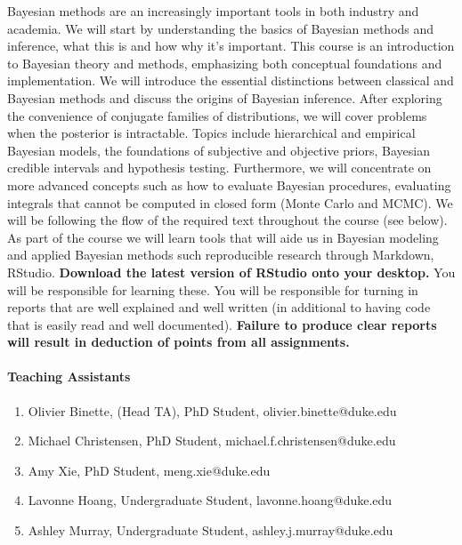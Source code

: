 \documentclass[11pt]{article}
\begin{document}
Bayesian methods are an increasingly important tools
in both industry and academia. We will start by understanding the basics of Bayesian methods and inference, what this is and how why it's important. This course is an introduction to Bayesian theory and methods, emphasizing both conceptual foundations and implementation. We will introduce the essential distinctions between classical and Bayesian methods and discuss the origins of Bayesian inference. After exploring the convenience of conjugate families of distributions, we will cover problems when the posterior is intractable. Topics include hierarchical and empirical Bayesian models, the foundations of subjective and objective priors, Bayesian credible intervals and hypothesis testing. Furthermore, we 
will  concentrate on more advanced concepts such as how to evaluate Bayesian procedures, evaluating integrals that cannot be computed in closed form (Monte Carlo and MCMC). We will be following the flow of the required text throughout the course (see below). \\

As part of the course we will learn tools that will aide us in Bayesian modeling and applied Bayesian methods such reproducible research through Markdown, RStudio. \textbf{Download the latest version of RStudio onto your desktop.} You will be responsible for learning these. You will be responsible for turning in reports that are well explained and well written (in additional to having code that is easily read and well documented). \textbf{Failure to produce clear reports will result in deduction of points from all assignments.} 
\\


\paragraph{Teaching Assistants}

\begin{enumerate}
\item Olivier Binette, (Head TA), PhD Student, olivier.binette@duke.edu
\item Michael Christensen, PhD Student, michael.f.christensen@duke.edu
\item Amy Xie, PhD Student, meng.xie@duke.edu
\item Lavonne Hoang, Undergraduate Student, lavonne.hoang@duke.edu
\item Ashley Murray, Undergraduate Student, ashley.j.murray@duke.edu
\end{enumerate}
\end{document}
